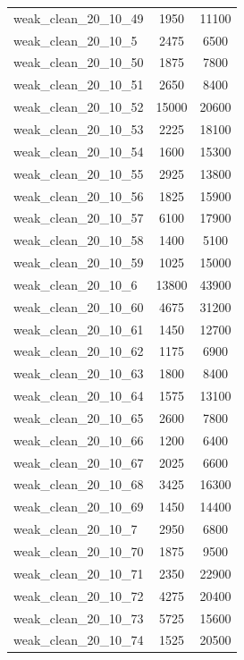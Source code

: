 \begin{longtable}{lcc}
weak\_clean\_20\_10\_49    &     1950 &  11100 \\
weak\_clean\_20\_10\_5     &     2475 &   6500 \\
weak\_clean\_20\_10\_50    &     1875 &   7800 \\
weak\_clean\_20\_10\_51    &     2650 &   8400 \\
weak\_clean\_20\_10\_52    &    15000 &  20600 \\
weak\_clean\_20\_10\_53    &     2225 &  18100 \\
weak\_clean\_20\_10\_54    &     1600 &  15300 \\
weak\_clean\_20\_10\_55    &     2925 &  13800 \\
weak\_clean\_20\_10\_56    &     1825 &  15900 \\
weak\_clean\_20\_10\_57    &     6100 &  17900 \\
weak\_clean\_20\_10\_58    &     1400 &   5100 \\
weak\_clean\_20\_10\_59    &     1025 &  15000 \\
weak\_clean\_20\_10\_6     &    13800 &  43900 \\
weak\_clean\_20\_10\_60    &     4675 &  31200 \\
weak\_clean\_20\_10\_61    &     1450 &  12700 \\
weak\_clean\_20\_10\_62    &     1175 &   6900 \\
weak\_clean\_20\_10\_63    &     1800 &   8400 \\
weak\_clean\_20\_10\_64    &     1575 &  13100 \\
weak\_clean\_20\_10\_65    &     2600 &   7800 \\
weak\_clean\_20\_10\_66    &     1200 &   6400 \\
weak\_clean\_20\_10\_67    &     2025 &   6600 \\
weak\_clean\_20\_10\_68    &     3425 &  16300 \\
weak\_clean\_20\_10\_69    &     1450 &  14400 \\
weak\_clean\_20\_10\_7     &     2950 &   6800 \\
weak\_clean\_20\_10\_70    &     1875 &   9500 \\
weak\_clean\_20\_10\_71    &     2350 &  22900 \\
weak\_clean\_20\_10\_72    &     4275 &  20400 \\
weak\_clean\_20\_10\_73    &     5725 &  15600 \\
weak\_clean\_20\_10\_74    &     1525 &  20500 \\

\end{longtable}
